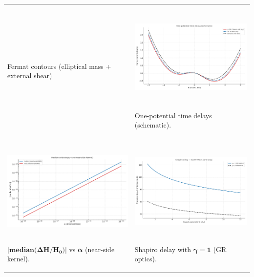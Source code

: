 \documentclass[
]{article}
\begin{document}
\begin{longtable}[]{@{}
  >{\raggedright\arraybackslash}p{}
  >{\raggedright\arraybackslash}p{}@{}}
Fermat contours (elliptical mass + external shear) &
\includegraphics[width=3.18782in,height=1.91145in,alt={image}]{explainer_media/media/image4.png}

One-potential time delays (schematic). \\
\includegraphics[width=3.17691in,height=1.9049in,alt={image}]{explainer_media/media/image5.png}

\(\mathbf{|median(\Delta}\mathbf{H}\mathbf{/}\mathbf{H}_{\mathbf{0}}\mathbf{)|}\)
vs \(\mathbf{\alpha}\) (near-side kernel). &
\includegraphics[width=3.1794in,height=1.9064in,alt={image}]{explainer_media/media/image6.png}

Shapiro delay with \(\mathbf{\gamma}\mathbf{=}\mathbf{1}\) (GR
optics). \\
\end{longtable}
\end{document}
